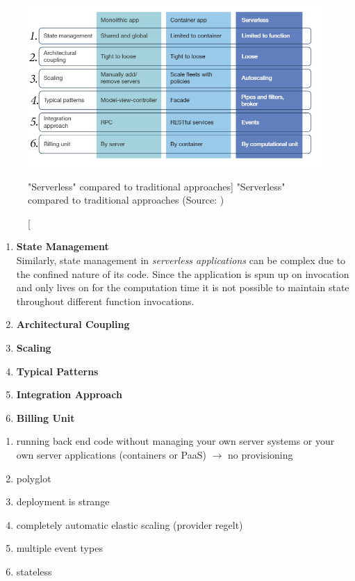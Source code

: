 \begin{enumerate}
        
    \begin{figure}[ht]
        \includegraphics[width=\linewidth]{images/serverless/demyst2.png}\centering
        \caption
        ["Serverless" compared to traditional approaches]
        {"Serverless" compared to traditional approaches (Source: \cite{Hammond2018DemystifyingComputing})}
        \label{fig:slessComparedSl}
    \end{figure}
    
    \begin{enumerate}
        \item \textbf{State Management}\\
        Similarly, state management in \textit{serverless applications} can be complex due to the confined nature of its code. Since the application is spun up on invocation and only lives on for the computation time it is not possible to maintain state throughout different function invocations.
        
        \item \textbf{Architectural Coupling}
        
        \item \textbf{Scaling}
        
        \item \textbf{Typical Patterns}
        
        \item \textbf{Integration Approach}
        
        \item \textbf{Billing Unit}
    \end{enumerate}
    
    
    
    \begin{enumerate}\label{lst:serverlessCharacteristics}
        \item running back end code without managing your own server systems or your own server applications (containers or PaaS) $\longrightarrow$ no provisioning
        \item polyglot
        \item deployment is strange 
        \item completely automatic elastic scaling (provider regelt)
        \item multiple event types
        \item stateless
    \end{enumerate}
    \autocite{Roberts2016ServerlessArchitectures}
    

\end{enumerate}
